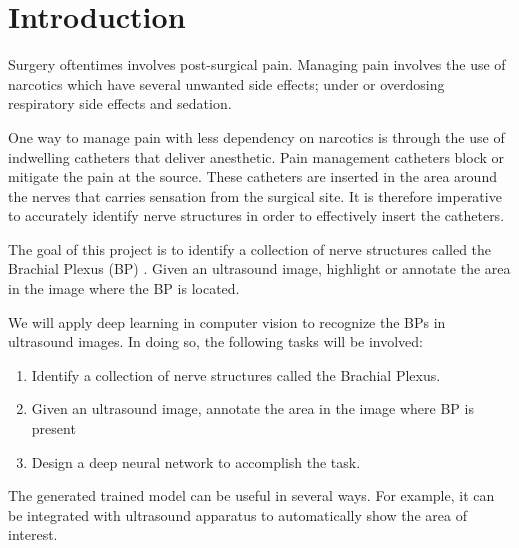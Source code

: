 \section{Introduction}
Surgery oftentimes involves post-surgical pain. Managing pain involves the use of narcotics which have several unwanted side effects; under or overdosing respiratory side effects and sedation.

One way to manage pain with less dependency on narcotics is through the use of indwelling catheters that deliver anesthetic. Pain management catheters block or mitigate the pain at the source. These catheters are inserted in the area around the nerves that carries sensation from the surgical site. It is therefore imperative to accurately identify nerve structures in order to effectively insert the catheters.

The goal of this project is to identify a collection of nerve structures called the Brachial Plexus (BP) . Given an ultrasound image, highlight or annotate the area in the image where the BP is located.

We will apply deep learning in computer vision to recognize the BPs in ultrasound images. In doing so, the following tasks will be involved:
\begin{enumerate}
  \item Identify a collection of nerve structures called the Brachial Plexus.
  \item Given an ultrasound image, annotate the area in the image where BP is present
  \item Design a deep neural network to accomplish the task.
\end{enumerate}
The generated trained model can be useful in several ways. For example, it can be integrated with ultrasound apparatus to automatically show the area of interest.
